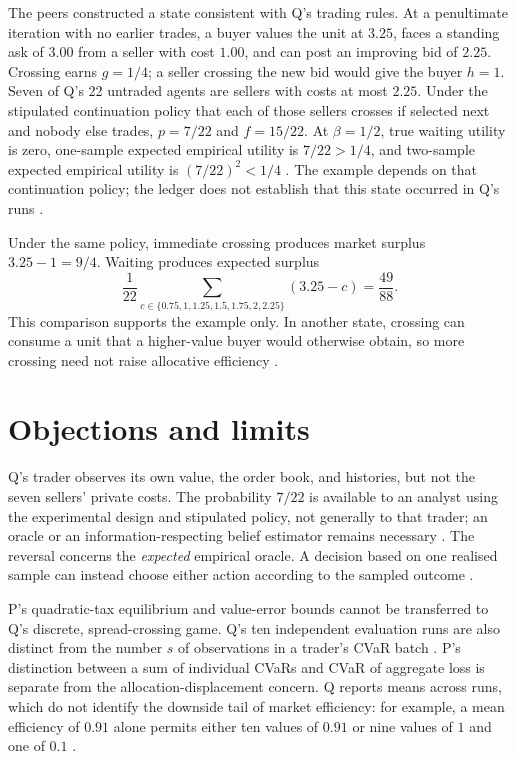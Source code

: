 \documentclass{article}
\begin{document}
The peers constructed a state consistent with Q's trading rules. At a penultimate iteration with no earlier trades, a buyer values the unit at \(3.25\), faces a standing ask of \(3.00\) from a seller with cost \(1.00\), and can post an improving bid of \(2.25\). Crossing earns \(g=1/4\); a seller crossing the new bid would give the buyer \(h=1\). Seven of Q's 22 untraded agents are sellers with costs at most \(2.25\). Under the stipulated continuation policy that each of those sellers crosses if selected next and nobody else trades, \(p=7/22\) and \(f=15/22\). At \(\beta=1/2\), true waiting utility is zero, one-sample expected empirical utility is \(7/22>1/4\), and two-sample expected empirical utility is \((7/22)^2<1/4\) . The example depends on that continuation policy; the ledger does not establish that this state occurred in Q's runs .

Under the same policy, immediate crossing produces market surplus \(3.25-1=9/4\). Waiting produces expected surplus
\[
 \frac{1}{22}
 \sum_{c\in\{0.75,1,1.25,1.5,1.75,2,2.25\}}(3.25-c)
 =\frac{49}{88}.
\]
This comparison supports the example only. In another state, crossing can consume a unit that a higher-value buyer would otherwise obtain, so more crossing need not raise allocative efficiency .

\section{Objections and limits}

Q's trader observes its own value, the order book, and histories, but not the seven sellers' private costs. The probability \(7/22\) is available to an analyst using the experimental design and stipulated policy, not generally to that trader; an oracle or an information-respecting belief estimator remains necessary . The reversal concerns the \emph{expected} empirical oracle. A decision based on one realised sample can instead choose either action according to the sampled outcome .

P's quadratic-tax equilibrium and value-error bounds cannot be transferred to Q's discrete, spread-crossing game. Q's ten independent evaluation runs are also distinct from the number \(s\) of observations in a trader's CVaR batch . P's distinction between a sum of individual CVaRs and CVaR of aggregate loss is separate from the allocation-displacement concern. Q reports means across runs, which do not identify the downside tail of market efficiency: for example, a mean efficiency of \(0.91\) alone permits either ten values of \(0.91\) or nine values of \(1\) and one of \(0.1\) .
\end{document}
